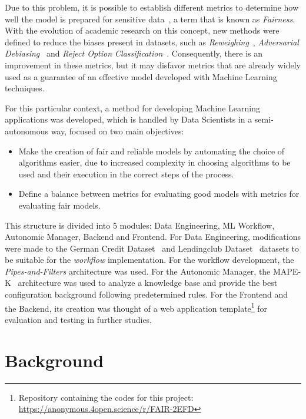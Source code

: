 \documentclass[10pt,conference]{IEEEtran}
\begin{document}
Due to this problem, it is possible to establish different metrics to determine how well the model is prepared for sensitive data~\citep{Begley_2021}, a term that is known as \textit{Fairness}. With the evolution of academic research on this concept, new methods were defined to reduce the biases present in datasets, such as \textit{Reweighing}~\citep{Kamiran_2011}, \textit{Adversarial Debiasing}~\citep{Zhang_2018} and \textit {Reject Option Classification}~\citep{Kamiran_2012}. Consequently, there is an improvement in these metrics, but it may disfavor metrics that are already widely used as a guarantee of an effective model developed with Machine Learning techniques.

For this particular context, a method for developing Machine Learning applications was developed, which is handled by Data Scientists in a semi-autonomous way, focused on two main objectives:

\begin{itemize}
\item Make the creation of fair and reliable models by automating the choice of algorithms easier, due to increased complexity in choosing algorithms to be used and their execution in the correct steps of the process.
\item Define a balance between metrics for evaluating good models with metrics for evaluating fair models.
\end{itemize}

This structure is divided into 5 modules: Data Engineering, ML Workflow, Autonomic Manager, Backend and Frontend. For Data Engineering, modifications were made to the German Credit Dataset~\citep{ucigerman_2021} and Lendingclub Dataset~\citep{lendingclub_2022} datasets to be suitable for the \textit{workflow} implementation. For the workflow development, the \textit{Pipes-and-Filters} architecture was used. For the Autonomic Manager, the MAPE-K~\citep{IBM_2005} architecture was used to analyze a knowledge base and provide the best configuration background following predetermined rules. For the Frontend and the Backend, its creation was thought of a web application template\footnote{Repository containing the codes for this project: \url{https://anonymous.4open.science/r/FAIR-2EFD}} for evaluation and testing in further studies.

\section{Background}
\end{document}
